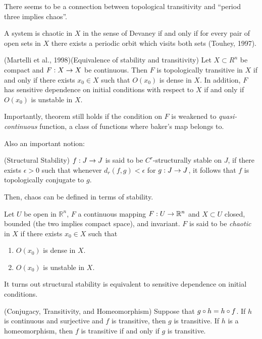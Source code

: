 \documentclass[11pt]{book}
\begin{document}
There seems to be a connection between topological transitivity and
``period three implies chaos''.

A system is chaotic in $X$ in the sense of Devaney if and only if
for every pair of open sets in $X$ there exists a periodic orbit 
which visits both sets (Touhey, 1997).

\begin{proposition}
  (Martelli et al., 1998)(Equivalence of stability and transitivity)
  Let $X\subset R^n$ be compact and $F: X\rightarrow X$ be continuous.
  Then $F$ is topologically transitive in $X$ if and only if
  there exists $x_0\in X$ such that $O(x_0)$ is dense in $X$.
  In addition, $F$ has sensitive dependence on initial conditions 
  with respect to $X$ if and only if $O(x_0)$ is unstable in $X$.
\end{proposition}

Importantly, theorem still holds if the condition on $F$ is 
weakened to {\it quasi-continuous} function, a class of functions
where baker's map belongs to.

Also an important notion:
\begin{definition}
  (Structural Stability) $f: J \rightarrow J$ is said to be $C^r$-structurally
  stable on $J$, if there exists $\epsilon > 0$ such that whenever
  $d_r(f,g) < \epsilon$ for $g: J\rightarrow J$, it follows that $f$
  is topologically conjugate to $g$.
\end{definition}

Then, chaos can be defined in terms of stability.
\begin{definition}
  Let $U$ be open in $\mathbb{R}^n$, $F$ a continuous mapping $F: U\rightarrow \mathbb{R}^n$ and $X\subset U$
  closed, bounded (the two implies compact space), and invariant.
  $F$ is said to be {\it chaotic} in $X$ if there exists $x_0\in X$
  such that
  \begin{enumerate}
    \item $O(x_0)$ is dense in $X$.
    \item $O(x_0)$ is unstable in $X$.
  \end{enumerate}
\end{definition}

It turns out structural stability is equivalent to sensitive dependence
on initial conditions.

\begin{proposition}
  (Conjugacy, Transitivity, and Homeomorphism) 
  Suppose that $g \circ h = h \circ f$. If $h$ is continuous and
  surjective and $f$ is transitive, then $g$ is transitive.
  If $h$ is a homeomorphism, then $f$ is transitive if and only if
  $g$ is transitive.
\end{proposition}




\printindex
\end{document}
